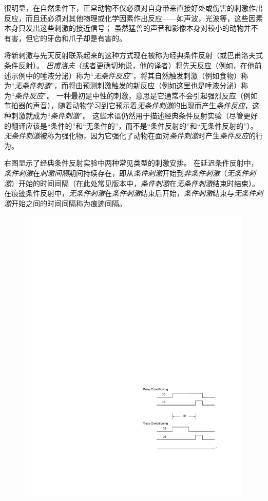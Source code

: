 很明显，在自然条件下，正常动物不仅必须对自身带来直接好处或伤害的刺激作出反应，而且还必须对其他物理或化学因素作出反应——如声波，光波等，这些因素本身只发出这些刺激的接近信号；
虽然猛兽的声音和影像本身对较小的动物并不有害，但它的牙齿和爪子却是有害的。


将新刺激与先天反射联系起来的这种方式现在被称为经典条件反射（或巴甫洛夫式条件反射）。
\textit{巴甫洛夫}（或者更确切地说，他的译者）将先天反应（例如，在他前述示例中的唾液分泌）称为“\textit{无条件反应}”，将其自然触发刺激（例如食物）称为“\textit{无条件刺激}”，而将由预测刺激触发的新反应（例如这里也是唾液分泌）称为“\textit{条件反应}”。
一种最初是中性的刺激，意思是它通常不会引起强烈反应（例如节拍器的声音），随着动物学习到它预示着\textit{无条件刺激}的出现而产生\textit{条件反应}，这种刺激就成为“\textit{条件刺激}”。
这些术语仍然用于描述经典条件反射实验（尽管更好的翻译应该是“条件的”和“无条件的”，而不是“条件反射的”和“无条件反射的”）。
\textit{无条件刺激}被称为强化物，因为它强化了动物在面对\textit{条件刺激}时产生\textit{条件反应}的行为。


右图显示了经典条件反射实验中两种常见类型的刺激安排。
在延迟条件反射中，\textit{条件刺激}在\textit{刺激间隔}期间持续存在，即从\textit{条件刺激}开始到\textit{非条件刺激}（\textit{无条件刺激}）开始的时间间隔（在此处常见版本中，\textit{条件刺激}在\textit{无条件刺激}结束时结束）。
在痕迹条件反射中，\textit{无条件刺激}在\textit{条件刺激}结束后开始，\textit{条件刺激}结束与\textit{无条件刺激}开始之间的时间间隔称为痕迹间隔。


\begin{figure}[!htb]
	\centering
	\includegraphics[width=0.5\linewidth]{chap11/fig_11_0}
	\caption{  \label{fig:11_0}}
\end{figure}


